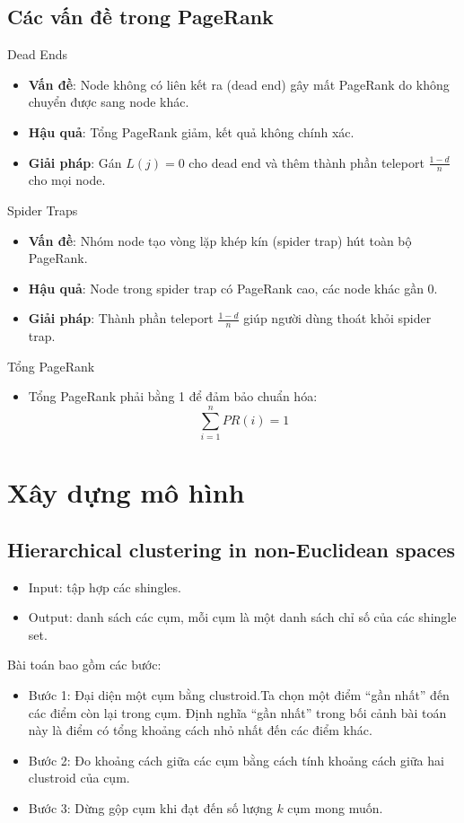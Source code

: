 \documentclass[conference]{IEEEtran}
\begin{document}
\subsection*{Các vấn đề trong PageRank}

Dead Ends
\begin{itemize}
    \item \textbf{Vấn đề}: Node không có liên kết ra (dead end) gây mất PageRank do không chuyển được sang node khác.
    \item \textbf{Hậu quả}: Tổng PageRank giảm, kết quả không chính xác.
    \item \textbf{Giải pháp}: Gán \( L(j) = 0 \) cho dead end và thêm thành phần teleport \( \frac{1-d}{n} \) cho mọi node.
\end{itemize}

Spider Traps
\begin{itemize}
    \item \textbf{Vấn đề}: Nhóm node tạo vòng lặp khép kín (spider trap) hút toàn bộ PageRank.
    \item \textbf{Hậu quả}: Node trong spider trap có PageRank cao, các node khác gần 0.
    \item \textbf{Giải pháp}: Thành phần teleport \( \frac{1-d}{n} \) giúp người dùng thoát khỏi spider trap.
\end{itemize}

Tổng PageRank
\begin{itemize}
    \item Tổng PageRank phải bằng 1 để đảm bảo chuẩn hóa:
    \begin{equation}
    \sum_{i=1}^n PR(i) = 1
    \end{equation}
\end{itemize}

\section{Xây dựng mô hình}
\subsection{Hierarchical clustering in non-Euclidean spaces}
\begin{itemize}
    \item Input: tập hợp các shingles.
    \item Output: danh sách các cụm, mỗi cụm là một danh sách chỉ số của các shingle set.
\end{itemize}

Bài toán bao gồm các bước:
\begin{itemize}
    \item Bước 1: Đại diện một cụm bằng clustroid.Ta chọn một điểm ``gần nhất'' đến các điểm còn lại trong cụm. Định nghĩa ``gần nhất'' trong bối cảnh bài toán này là điểm có tổng khoảng cách nhỏ nhất đến các điểm khác. 
    \item Bước 2: Đo khoảng cách giữa các cụm bằng cách tính khoảng cách giữa hai clustroid của cụm.
    \item Bước 3: Dừng gộp cụm khi đạt đến số lượng $k$ cụm mong muốn.
\end{itemize}
\end{document}
